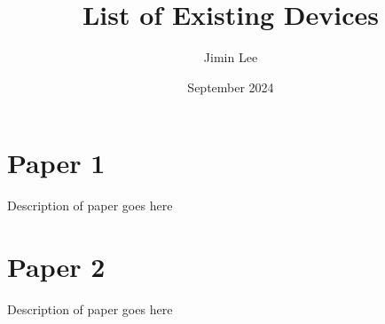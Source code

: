 \documentclass[12pt]{article}
\title{List of Existing Devices}
\author{Jimin Lee}
\date{September 2024}
\begin{document}
\maketitle

\section{Paper 1}
Description of paper goes here

\section{Paper 2}
Description of paper goes here
\end{document}
